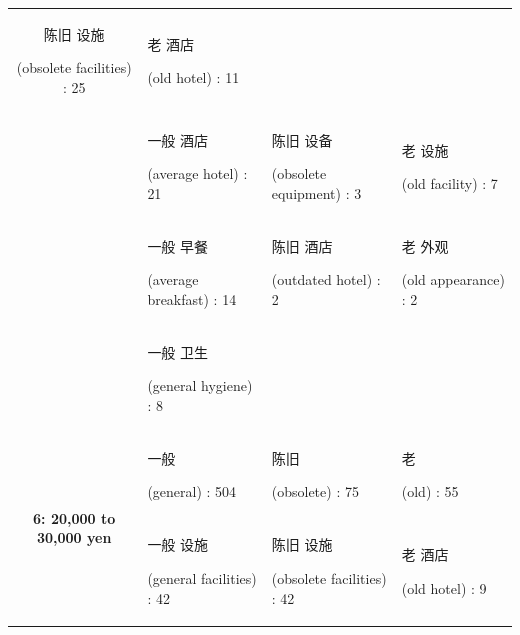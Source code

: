 \documentclass[smallextended,natbib]{svjour3}       %
\begin{document}
\begin{landscape}
\begin{table}[p]
{\begin{tabular}{|c|l|l|l|}
          \begin{CJK}{UTF8}{gbsn}陈旧 设施\end{CJK} (obsolete facilities) : 25 &
          \begin{CJK}{UTF8}{gbsn}老 酒店\end{CJK} (old hotel) : 11 \\
         &
          \begin{CJK}{UTF8}{gbsn}一般 酒店\end{CJK} (average hotel) : 21 &
          \begin{CJK}{UTF8}{gbsn}陈旧 设备\end{CJK} (obsolete equipment) : 3 &
          \begin{CJK}{UTF8}{gbsn}老 设施\end{CJK} (old facility) : 7 \\
         &
          \begin{CJK}{UTF8}{gbsn}一般 早餐\end{CJK} (average breakfast) : 14 &
          \begin{CJK}{UTF8}{gbsn}陈旧 酒店\end{CJK} (outdated hotel) : 2 &
          \begin{CJK}{UTF8}{gbsn}老 外观\end{CJK} (old appearance) : 2 \\
         &
          \begin{CJK}{UTF8}{gbsn}一般 卫生\end{CJK} (general hygiene) : 8 &
           &
           \\ \hline
        \multirow{5}{*}{\textbf{6: 20,000 to 30,000 yen}} &
          \begin{CJK}{UTF8}{gbsn}一般\end{CJK} (general) : 504 &
          \begin{CJK}{UTF8}{gbsn}陈旧\end{CJK} (obsolete) : 75 &
          \begin{CJK}{UTF8}{gbsn}老\end{CJK} (old) : 55 \\
         &
          \begin{CJK}{UTF8}{gbsn}一般 设施\end{CJK} (general facilities) : 42 &
          \begin{CJK}{UTF8}{gbsn}陈旧 设施\end{CJK} (obsolete facilities) : 42 &
          \begin{CJK}{UTF8}{gbsn}老 酒店\end{CJK} (old hotel) : 9 \\

\end{tabular}}
\end{table}
\end{landscape}
\end{document}
